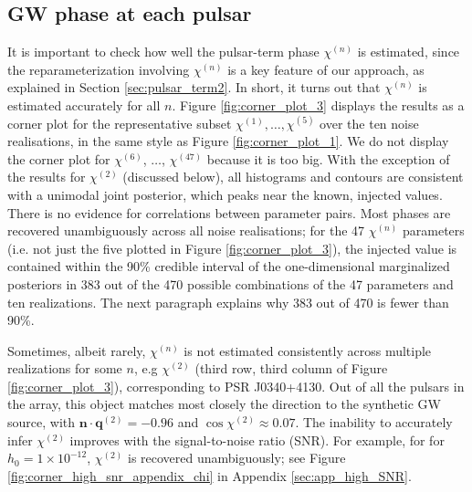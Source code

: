 \documentclass[fleqn,usenatbib,useAMS]{mnras}
\begin{document}
\subsection{GW phase at each pulsar} \label{sec:chi_estim}
It is important to check how well the pulsar-term phase $\chi^{(n)}$ is estimated, since the reparameterization involving $\chi^{(n)}$ is a key feature of our approach, as explained in Section \ref{sec:pulsar_term2}. In short, it turns out that $\chi^{(n)}$ is estimated accurately for all $n$. Figure \ref{fig:corner_plot_3} displays the results as a corner plot for the representative subset $\chi^{(1)}, \dots, \chi^{(5)}$ over the ten noise realisations, in the same style as Figure \ref{fig:corner_plot_1}. We do not display the corner plot for $\chi^{(6)}$, $\dots$, $\chi^{(47)}$ because it is too big. With the exception of the results for $\chi^{(2)}$ (discussed below), all histograms and contours are consistent with a unimodal joint posterior, which peaks near the known, injected values. There is no evidence for correlations between parameter pairs. Most phases are recovered unambiguously across all noise realisations; for the 47 $\chi^{(n)}$ parameters (i.e. not just the five plotted in Figure \ref{fig:corner_plot_3}), the injected value is  contained within the 90\% credible interval of the one-dimensional marginalized posteriors in 383 out of the 470 possible combinations of the 47 parameters and ten realizations. The next paragraph explains why 383 out of 470 is fewer than 90\%. \newline 

Sometimes, albeit rarely, $\chi^{(n)}$ is not estimated consistently across multiple realizations for some $n$, e.g $\chi^{(2)}$ (third row, third column of Figure \ref{fig:corner_plot_3}), corresponding to PSR J0340+4130. Out of all the pulsars in the array, this object matches most closely the direction to the synthetic GW source, with $\boldsymbol{n} \cdot \boldsymbol{q}^{(2)} = -0.96$ and $\cos \chi^{(2)} \approx 0.07$. The inability to accurately infer $\chi^{(2)}$ improves with the signal-to-noise ratio (SNR). For example, for for $h_0 = 1 \times 10^{-12}$, $\chi^{(2)}$ is recovered unambiguously; see Figure \ref{fig:corner_high_snr_appendix_chi} in Appendix \ref{sec:app_high_SNR}. \newline 
\end{document}

